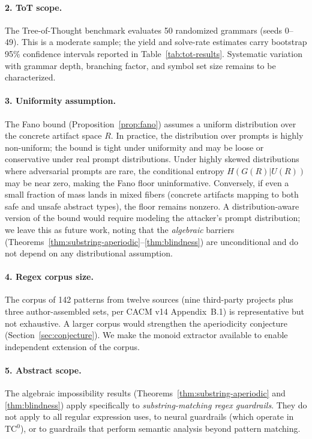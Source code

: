 \documentclass[letterpaper,twocolumn,10pt]{article}
\theoremstyle{definition}
\theoremstyle{remark}
\begin{document}
\paragraph{2. ToT scope.}
The Tree-of-Thought benchmark evaluates 50 randomized grammars (seeds 0--49).
This is a moderate sample; the yield and solve-rate estimates carry bootstrap
95\% confidence intervals reported in Table~\ref{tab:tot-results}.
Systematic variation with grammar depth, branching factor, and symbol set size
remains to be characterized.

\paragraph{3. Uniformity assumption.}
The Fano bound (Proposition~\ref{prop:fano}) assumes a uniform distribution over
the concrete artifact space $R$.
In practice, the distribution over prompts is highly non-uniform; the bound is
tight under uniformity and may be loose or conservative under real prompt
distributions.
Under highly skewed distributions where adversarial prompts are rare, the
conditional entropy $H(G(R)|U(R))$ may be near zero, making the Fano floor
uninformative.
Conversely, if even a small fraction of mass lands in mixed fibers (concrete
artifacts mapping to both safe and unsafe abstract types), the floor remains
nonzero.
A distribution-aware version of the bound would require modeling the attacker's
prompt distribution; we leave this as future work, noting that the
\emph{algebraic} barriers (Theorems~\ref{thm:substring-aperiodic}--\ref{thm:blindness})
are unconditional and do not depend on any distributional assumption.

\paragraph{4. Regex corpus size.}
The corpus of 142 patterns from twelve sources (nine third-party projects
plus three author-assembled sets, per CACM v14 Appendix~B.1) is
representative but not exhaustive.
A larger corpus would strengthen the aperiodicity conjecture
(Section~\ref{sec:conjecture}).
We make the monoid extractor available to enable independent extension of the corpus.

\paragraph{5. Abstract scope.}
The algebraic impossibility results (Theorems~\ref{thm:substring-aperiodic}
and \ref{thm:blindness}) apply specifically to \emph{substring-matching regex
guardrails}.
They do not apply to all regular expression uses, to neural guardrails (which
operate in $\mathrm{TC}^0$), or to guardrails that perform semantic analysis
beyond pattern matching.
\end{document}
